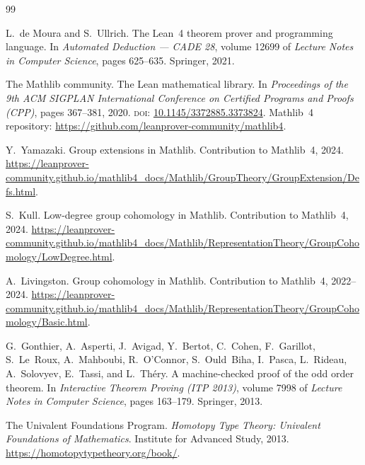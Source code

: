 \documentclass[11pt]{article}
\begin{document}
\begin{thebibliography}{99}

L.~de Moura and S.~Ullrich.
\newblock The {L}ean~4 theorem prover and programming language.
\newblock In \emph{Automated Deduction --- CADE 28}, volume 12699 of
  \emph{Lecture Notes in Computer Science}, pages 625--635. Springer, 2021.

The Mathlib community.
\newblock The {L}ean mathematical library.
\newblock In \emph{Proceedings of the 9th ACM SIGPLAN International Conference
  on Certified Programs and Proofs (CPP)}, pages 367--381, 2020.
\newblock \textsc{doi}: \href{https://doi.org/10.1145/3372885.3373824}{10.1145/3372885.3373824}.
\newblock Mathlib~4 repository: \url{https://github.com/leanprover-community/mathlib4}.

Y.~Yamazaki.
\newblock Group extensions in {M}athlib.
\newblock Contribution to Mathlib~4, 2024.
\newblock \url{https://leanprover-community.github.io/mathlib4_docs/Mathlib/GroupTheory/GroupExtension/Defs.html}.

S.~Kull.
\newblock Low-degree group cohomology in {M}athlib.
\newblock Contribution to Mathlib~4, 2024.
\newblock \url{https://leanprover-community.github.io/mathlib4_docs/Mathlib/RepresentationTheory/GroupCohomology/LowDegree.html}.

A.~Livingston.
\newblock Group cohomology in {M}athlib.
\newblock Contribution to Mathlib~4, 2022--2024.
\newblock \url{https://leanprover-community.github.io/mathlib4_docs/Mathlib/RepresentationTheory/GroupCohomology/Basic.html}.

G.~Gonthier, A.~Asperti, J.~Avigad, Y.~Bertot, C.~Cohen, F.~Garillot,
  S.~Le~Roux, A.~Mahboubi, R.~O'Connor, S.~Ould~Biha, I.~Pasca, L.~Rideau,
  A.~Solovyev, E.~Tassi, and L.~Th\'ery.
\newblock A machine-checked proof of the odd order theorem.
\newblock In \emph{Interactive Theorem Proving (ITP 2013)}, volume 7998 of
  \emph{Lecture Notes in Computer Science}, pages 163--179. Springer, 2013.

The Univalent Foundations Program.
\newblock \emph{Homotopy Type Theory: Univalent Foundations of Mathematics}.
\newblock Institute for Advanced Study, 2013.
\newblock \url{https://homotopytypetheory.org/book/}.


\end{thebibliography}
\end{document}
